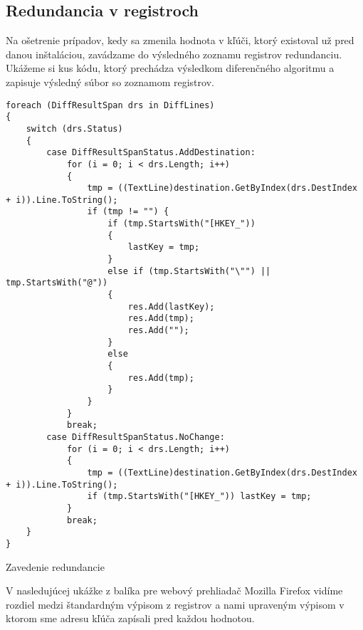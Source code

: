 \subsection{Redundancia v registroch}
Na ošetrenie prípadov, kedy sa zmenila hodnota v kľúči, ktorý existoval už pred danou inštaláciou, zavádzame do výsledného zoznamu registrov redundanciu. Ukážeme si kus kódu, ktorý prechádza výsledkom diferenčného algoritmu a zapisuje výsledný súbor so zoznamom registrov.
\begin{listing}
\begin{verbatim}
foreach (DiffResultSpan drs in DiffLines)
{
    switch (drs.Status)
    {
        case DiffResultSpanStatus.AddDestination:
            for (i = 0; i < drs.Length; i++)
            {
                tmp = ((TextLine)destination.GetByIndex(drs.DestIndex + i)).Line.ToString();
                if (tmp != "") {
                    if (tmp.StartsWith("[HKEY_"))
                    {
                        lastKey = tmp;
                    }
                    else if (tmp.StartsWith("\"") || tmp.StartsWith("@")) 
                    {
                        res.Add(lastKey);
                        res.Add(tmp);
                        res.Add("");
                    }
                    else 
                    {
                        res.Add(tmp);
                    }
                }
            }
            break;
        case DiffResultSpanStatus.NoChange:
            for (i = 0; i < drs.Length; i++)
            {
                tmp = ((TextLine)destination.GetByIndex(drs.DestIndex + i)).Line.ToString();
                if (tmp.StartsWith("[HKEY_")) lastKey = tmp;
            }
            break;
    }
}
\end{verbatim}
\caption{Zavedenie redundancie}
\label{lst:regredun}
\end{listing}

V nasledujúcej ukážke z balíka pre webový prehliadač Mozilla Firefox vidíme rozdiel medzi štandardným výpisom z registrov a nami upraveným výpisom v ktorom sme adresu kľúča zapísali pred každou hodnotou.

